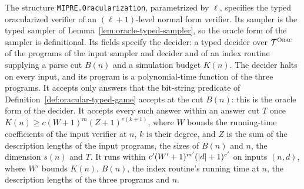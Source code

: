 \begin{definition}
\label{def:oracularization-contract}
\leanok
The structure \texttt{MIPRE.Oracularization}, parametrized by $\ell$, specifies the typed
oracularized verifier of an $(\ell + 1)$-level normal form verifier. Its sampler is the typed
sampler of Lemma~\ref{lem:oracle-typed-sampler}, so the oracle form of the sampler is
definitional. Its fields specify the decider: a typed decider over $\mathcal{T}^{\textsc{Orac}}$ of the programs
of the input sampler and decider and of an index routine supplying a parse cut $B(n)$ and a
simulation budget $K(n)$. The decider halts on every input, and its program is a polynomial-time
function of the three programs. It accepts only answers that the bit-string predicate of
Definition~\ref{def:oracular-typed-game} accepts at the cut $B(n)$: this is the oracle form of the
decider. It accepts every such answer within an answer cut $T$ once
$K(n) \geq c(W + 1)^m(Z + 1)^{e(k + 1)}$, where $W$ bounds the running-time coefficients of the
input verifier at $n$, $k$ is their degree, and $Z$ is the sum of the description lengths of the
input programs, the sizes of $B(n)$ and $n$, the dimension $s(n)$ and $T$. It runs within
$c'(W' + 1)^{m'}(\left\vert {d} \right\vert + 1)^{e'}$ on inputs $(n, d)$, where $W'$ bounds $K(n)$, $B(n)$, the index
routine's running time at $n$, the description lengths of the three programs and $n$.
\end{definition}

